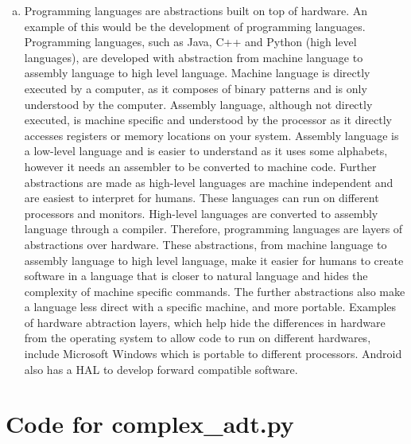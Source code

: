 \documentclass[12pt]{article}
\begin{document}
\begin{enumerate}[(a)]
\item Programming languages are abstractions built on top of hardware. An example of this would be the development of programming languages. Programming languages, such as Java, C++ and Python (high level languages), are developed with abstraction from machine language to assembly language to high level language. Machine language is directly executed by a computer, as it composes of binary patterns and is only understood by the computer. Assembly language, although not directly executed, is machine specific and understood by the processor as it directly accesses registers or memory locations on your system. Assembly language is a low-level language and is easier to understand as it uses some alphabets, however it needs an assembler to be converted to machine code. Further abstractions are made as high-level languages are machine independent and are easiest to interpret for humans. These languages can run on different processors and monitors. High-level languages are converted to assembly language through a compiler. Therefore, programming languages are layers of abstractions over hardware. These abstractions, from machine language to assembly language to high level language, make it easier for humans to create software in a language that is closer to natural language and hides the complexity of machine specific commands. The further abstractions also make a language less direct with a specific machine, and more portable.
Examples of hardware abtraction layers, which help hide the differences in hardware from the operating system to allow code to run on different hardwares, include Microsoft Windows which is portable to different processors. Android also has a HAL to develop forward compatible software.
\end{enumerate}

\newpage

\lstset{language=Python, basicstyle=\tiny, breaklines=true, showspaces=false,
  showstringspaces=false, breakatwhitespace=true}

\def\thesection{\Alph{section}}

\section{Code for complex\_adt.py}

\noindent 

\newpage
\end{document}
